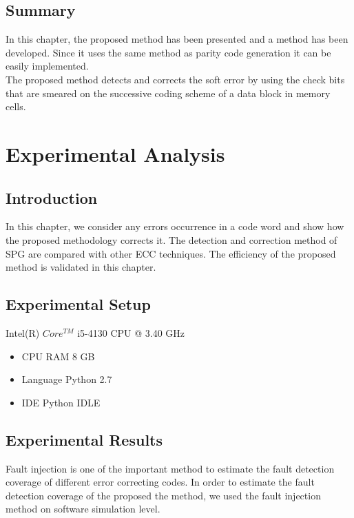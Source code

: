 \documentclass[12pt,a4paper]{report}
\begin{document}
 \section{Summary}
 In this chapter, the proposed method has been presented and a method has been developed. Since it uses the same method as parity code generation it can be easily implemented.\\
 
The proposed method detects and corrects the soft error by using the check bits that are smeared on the successive coding scheme of a data block in memory cells.
 
 
 \chapter{Experimental Analysis}
 \section{Introduction}
 In this chapter, we consider any errors occurrence in a code word and show how the proposed
 methodology corrects it. The detection and correction method of SPG are compared with other
 ECC techniques. The efficiency of the proposed method is validated in this chapter.
 \section{Experimental Setup}
Intel(R) $Core^{TM}$ i5-4130 CPU @ 3.40 GHz
\begin{itemize}
  \item CPU RAM 8 GB
  \item Language Python 2.7
  \item IDE Python IDLE
\end{itemize}
  
 \section{Experimental Results}
 Fault injection is one of the important method to estimate the fault detection coverage of different error correcting codes. In order to estimate the fault detection coverage of the proposed the method, we used the fault injection method on software simulation level.\\
 
\end{document}
